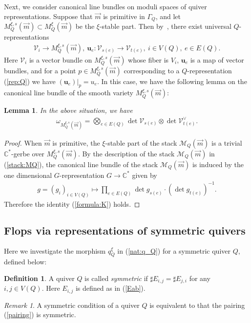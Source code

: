 \documentclass[11pt]{amsart}
\theoremstyle{plain}
\newtheorem{lem}[thm]{Lemma}
\theoremstyle{definition}
\newtheorem{defi}[thm]{Definition}
\theoremstyle{remark}
\newtheorem{rmk}[thm]{Remark}
\newcommand{\mM}{\mathcal{M}}
\newcommand{\vV}{\mathcal{V}}
\begin{document}
Next, we consider canonical line 
bundles on moduli spaces of quiver representations. 
Suppose that $\vec{m}$ is primitive in 
$\Gamma_{Q}$, and let 
$M_Q^{\xi, s}(\vec{m}) \subset M_Q^{\xi}(\vec{m})$ be the 
$\xi$-stable part. 
Then by~\cite[Proposition~5.3]{Kin}, 
there exist universal $Q$-representations
\begin{align*}
\vV_i \to M_Q^{\xi, s}(\vec{m}), \ 
\mathbf{u}_e \colon \vV_{s(e)} \to \vV_{t(e)}, \ 
i \in V(Q), \ e \in E(Q).
\end{align*}
Here $\vV_i$ is a vector bundle on $M_Q^{\xi, s}(\vec{m})$ whose fiber 
is $V_i$, 
$\mathbf{u}_e$ is a map of vector bundles, 
and 
for a point $p \in M_Q^{\xi, s}(\vec{m})$ corresponding to 
a $Q$-representation (\ref{rep:Q}) 
we have $(\mathbf{u}_e)|_{p}=u_e$. 
In this case, 
we have the following lemma on the canonical 
line bundle of the smooth variety 
$M_Q^{\xi, s}(\vec{m})$:
\begin{lem}\label{lem:formula:K}
In the above situation,
we have 
\begin{align}\label{formula:K}
\omega_{M_Q^{\xi, s}(\vec{m})}=\bigotimes_{e \in E(Q)}\det \vV_{s(e)}
\otimes \det \vV_{t(e)}^{\vee}.  
\end{align}
\end{lem}
\begin{proof}
When $\vec{m}$ is primitive, 
the $\xi$-stable part of 
the stack $\mM_Q(\vec{m})$
is a trivial $\mathbb{C}^{\ast}$-gerbe over $M_Q^{\xi, s}(\vec{m})$. 
By the description of the stack $\mM_Q(\vec{m})$ in (\ref{stack:MQ}), 
the 
canonical line bundle of
the stack $\mM_Q(\vec{m})$ 
is induced by the one dimensional $G$-representation $G \to \mathbb{C}^{\ast}$ 
given by 
\begin{align*}
g=(g_i)_{i \in V(Q)} \mapsto 
\prod_{e \in E(Q)} \det g_{s(e)} \cdot (\det g_{t(e)})^{-1}.
\end{align*}
Therefore the identity (\ref{formula:K}) holds. 
\end{proof} 
 

\subsection{Flops via representations of symmetric quivers}
Here we investigate 
the morphism $q_{Q}^{\xi}$ in (\ref{nat:q_Q})
for a symmetric quiver $Q$, defined 
below: 
\begin{defi}\label{def:symmetric}
A quiver $Q$ is called \textit{symmetric} if 
$\sharp E_{i, j}=\sharp E_{j, i}$ for any 
$i, j \in V(Q)$. 
Here $E_{i, j}$ is defined as in (\ref{Eab}). 
\end{defi}
\begin{rmk}\label{rmk:symmetric}
A symmetric condition of a quiver $Q$ 
is equivalent to that 
the pairing (\ref{pairing}) is symmetric. 
\end{rmk}
\end{document}
